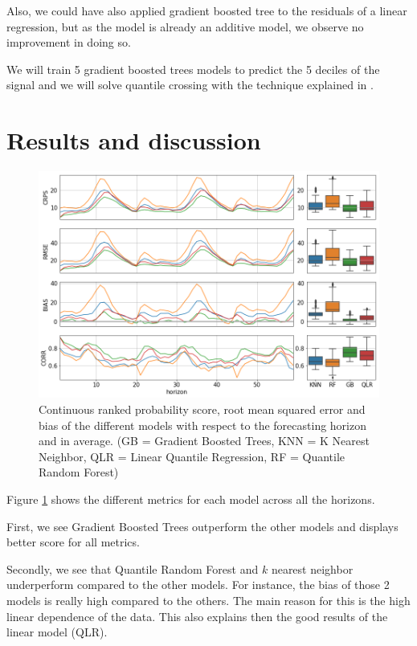 \documentclass[a4paper,twocolumn,5p]{elsarticle}
\begin{document}
Also, we could have also applied gradient boosted tree to the residuals of a linear 
regression, but as the model is already an additive model, we observe no improvement 
in doing so. 

We will train 5 gradient boosted trees models to 
predict the 5 deciles of the signal and we will solve 
 quantile crossing with the technique explained 
 in \cite{cross}. 

\section{Results and discussion}
\label{sec:results}

\begin{figure}
  \centering
  \includegraphics[width=\textwidth]{results/errorGraph}
  \caption{Continuous ranked probability score, root mean squared
    error and bias of the different models with respect to the
    forecasting horizon and in average. (GB = Gradient Boosted Trees,
    KNN = K Nearest Neighbor,
    QLR = Linear Quantile Regression,
    RF = Quantile Random Forest)}
  \label{figure:errorGraph}
\end{figure}

Figure \ref{figure:errorGraph} shows the different metrics for each 
model across all the horizons.

First, we see Gradient Boosted Trees outperform 
the other models and 
displays better score for all metrics.

Secondly, we see that Quantile Random Forest and 
$k$ nearest neighbor underperform compared to the other 
models. For instance, the bias of those 2 models 
is really high compared 
to the others. 
The main reason for this is the high 
linear dependence of 
the data. This also explains then the good results 
of the linear model (QLR).
\end{document}
